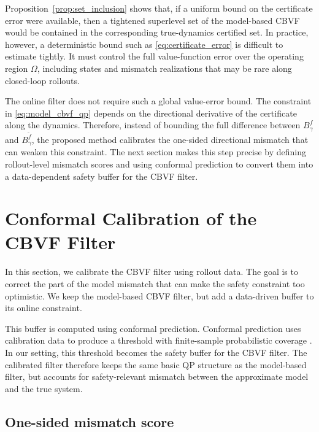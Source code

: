 \documentclass[letterpaper,10pt,conference]{ieeeconf}
\newcommand{\Bm}{B_{\gamma}^{\tilde f}}
\newcommand{\Bt}{B_{\gamma}^{f}}
\begin{document}
Proposition~\ref{prop:set_inclusion} shows that, if a uniform bound on the
certificate error were available, then a tightened superlevel set of the
model-based CBVF would be contained in the corresponding true-dynamics
certified set. In practice, however, a deterministic bound such as
\eqref{eq:certificate_error} is difficult to estimate tightly. It must control
the full value-function error over the operating region $\Omega$, including
states and mismatch realizations that may be rare along closed-loop rollouts.

The online filter does not require such a global value-error bound. The
constraint in \eqref{eq:model_cbvf_qp} depends on the directional derivative of
the certificate along the dynamics. Therefore, instead of bounding the full
difference between $\Bt$ and $\Bm$, the proposed method calibrates the
one-sided directional mismatch that can weaken this constraint. The next
section makes this step precise by defining rollout-level mismatch scores and
using conformal prediction to convert them into a data-dependent safety buffer
for the CBVF filter.







\section{Conformal Calibration of the CBVF Filter}
\label{sec:conformal_calibration}

In this section, we calibrate the CBVF filter using rollout data. The goal is
to correct the part of the model mismatch that can make the safety constraint
too optimistic. We keep the model-based CBVF filter, but add a data-driven
buffer to its online constraint.

This buffer is computed using conformal prediction. Conformal prediction uses
calibration data to produce a threshold with finite-sample probabilistic
coverage \cite{angelopoulos2023conformal,shafer2008tutorial}. In our setting,
this threshold becomes the safety buffer for the CBVF filter. The calibrated
filter therefore keeps the same basic QP structure as the model-based filter,
but accounts for safety-relevant mismatch between the approximate model and the
true system.
\subsection{One-sided mismatch score}
\end{document}
